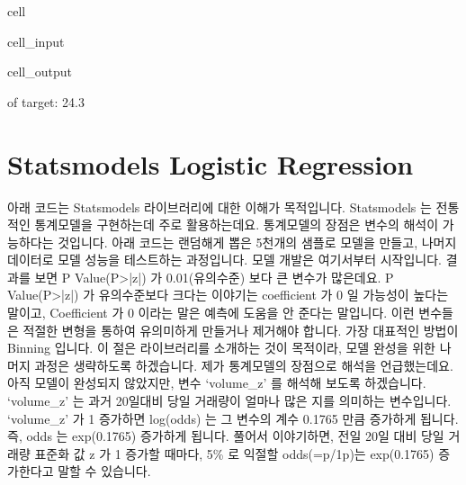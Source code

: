 \documentclass[letterpaper,10pt,english]{jupyterBook}
\begin{document}
\begin{sphinxuseclass}{cell}
\begin{sphinxVerbatimInput}
\begin{sphinxuseclass}{cell_input}
\end{sphinxuseclass}\end{sphinxVerbatimInput}
\begin{sphinxVerbatimOutput}

\begin{sphinxuseclass}{cell_output}
\begin{sphinxVerbatim}[commandchars=\\\{\}]
\PYGZpc{} of target: 24.3\PYGZpc{}
\end{sphinxVerbatim}

\end{sphinxuseclass}\end{sphinxVerbatimOutput}

\end{sphinxuseclass}

\section{Statsmodels \sphinxhyphen{} Logistic Regression}
\label{\detokenize{chapter5/5.2.2_Modeling_Library:statsmodels-logistic-regression}}
\sphinxAtStartPar
아래 코드는 Statsmodels 라이브러리에 대한 이해가 목적입니다. Statsmodels 는 전통적인 통계모델을 구현하는데 주로 활용하는데요. 통계모델의 장점은 변수의 해석이 가능하다는 것입니다. 아래 코드는 랜덤해게 뽑은 5천개의 샘플로 모델을 만들고, 나머지 데이터로 모델 성능을 테스트하는 과정입니다. 모델 개발은 여기서부터 시작입니다.  결과를 보면 P Value(P>|z|) 가 0.01(유의수준) 보다 큰 변수가 많은데요. P Value(P>|z|) 가 유의수준보다 크다는 이야기는 coefficient 가 0 일 가능성이 높다는 말이고, Coefficient 가 0 이라는 말은 예측에 도움을 안 준다는 말입니다. 이런 변수들은 적절한 변형을 통하여 유의미하게 만들거나 제거해야 합니다. 가장 대표적인 방법이 Binning 입니다. 이 절은 라이브러리를 소개하는 것이 목적이라, 모델 완성을 위한 나머지 과정은 생략하도록 하겠습니다. 제가 통계모델의 장점으로 해석을 언급했는데요. 아직 모델이 완성되지 않았지만, 변수 ‘volume\_z’ 를 해석해 보도록 하겠습니다. ‘volume\_z’ 는 과거 20일대비 당일 거래량이 얼마나 많은 지를 의미하는 변수입니다. ‘volume\_z’ 가 1 증가하면 log(odds) 는 그 변수의 계수 0.1765 만큼 증가하게 됩니다. 즉, odds 는 exp(0.1765) 증가하게 됩니다. 풀어서 이야기하면, 전일 20일 대비 당일 거래량 표준화 값 z 가  1 증가할 때마다, 5\% 로 익절할 odds(=p/1\sphinxhyphen{}p)는 exp(0.1765) 증가한다고 말할 수 있습니다.
\end{document}
